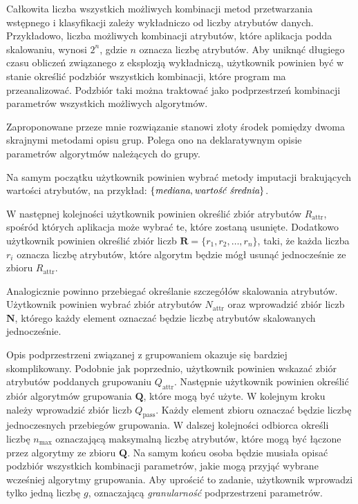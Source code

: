 \documentclass[../thesis.tex]{subfiles}
\begin{document}
Całkowita liczba wszystkich możliwych kombinacji metod przetwarzania wstępnego i klasyfikacji zależy wykładniczo od liczby atrybutów danych. Przykładowo, liczba możliwych kombinacji atrybutów, które aplikacja podda skalowaniu, wynosi $2^{n}$, gdzie $n$ oznacza liczbę atrybutów. Aby uniknąć długiego czasu obliczeń związanego z eksplozją wykładniczą, użytkownik powinien być w stanie określić podzbiór wszystkich kombinacji, które program ma przeanalizować. Podzbiór taki można traktować jako podprzestrzeń kombinacji parametrów wszystkich możliwych algorytmów.

Zaproponowane przeze mnie rozwiązanie stanowi złoty środek pomiędzy dwoma skrajnymi metodami opisu grup. Polega ono na deklaratywnym opisie parametrów algorytmów należących do grupy. 

Na samym początku użytkownik powinien wybrać metody imputacji brakujących wartości atrybutów, na przykład: $\{\emph{mediana}, \emph{wartość średnia}\}$.

W następnej kolejności użytkownik powinien określić zbiór atrybutów $R_\textrm{attr}$, spośród których aplikacja może wybrać te, które zostaną usunięte. Dodatkowo użytkownik powinien określić zbiór liczb $\textbf{R} = \{r_1, r_2, \ldots, r_n\}$, taki, że każda liczba $r_i$ oznacza liczbę atrybutów, które algorytm będzie mógł usunąć jednocześnie ze zbioru $R_\textrm{attr}$.

Analogicznie powinno przebiegać określanie szczegółów skalowania atrybutów. Użytkownik powinien wybrać zbiór atrybutów $N_\textrm{attr}$ oraz wprowadzić zbiór liczb $\textbf{N}$, którego każdy element oznaczać będzie liczbę atrybutów skalowanych jednocześnie.

Opis podprzestrzeni związanej z grupowaniem okazuje się bardziej skomplikowany. Podobnie jak poprzednio, użytkownik powinien wskazać zbiór atrybutów poddanych grupowaniu $Q_\textrm{attr}$. Następnie użytkownik powinien określić zbiór algorytmów grupowania $\textbf{Q}$, które mogą być użyte. W kolejnym kroku należy wprowadzić zbiór liczb $Q_\textrm{pass}$. Każdy element zbioru oznaczać będzie liczbę jednoczesnych przebiegów grupowania. W dalszej kolejności odbiorca określi liczbę $n_\textrm{max}$ oznaczającą maksymalną liczbę atrybutów, które mogą być łączone przez algorytmy ze zbioru $\textbf{Q}$. Na samym końcu osoba będzie musiała opisać podzbiór wszystkich kombinacji parametrów, jakie mogą przyjąć wybrane wcześniej algorytmy grupowania. Aby uprościć to zadanie, użytkownik wprowadzi tylko jedną liczbę $g$, oznaczającą \textit{granularność} podprzestrzeni parametrów. 
\end{document}
